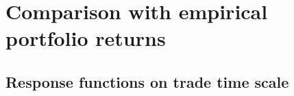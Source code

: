 \section{Comparison with empirical portfolio returns}
\label{sec:comparison_returns}



\subsection{Response functions on trade time scale}
\label{subsec:response_function_trade}

